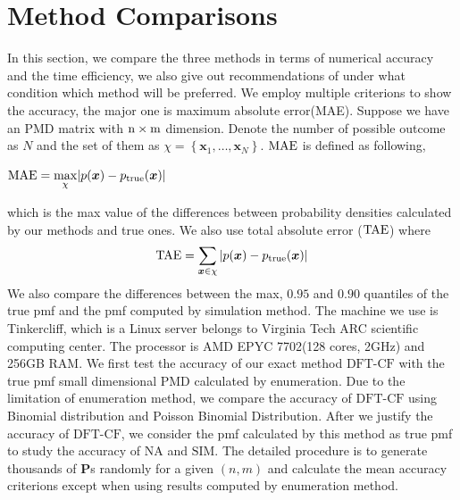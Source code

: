 \documentclass[12pt]{article}
\newcommand{\Pmat}{\mathbf{P}}
\newcommand{\TAE}{{\rm TAE}}
\newcommand{\MAE}{{\rm MAE}}
\newcommand{\PMD}{\textrm{PMD}}
\newcommand{\xvec}{\boldsymbol{x}}
\newcommand{\SIM}{{\textrm{SIM}}}
\newcommand{\NA}{{\textrm{NA}}}
\newcommand{\dft}{{\textrm{DFT-CF}}}
\begin{document}
\section{Method Comparisons}\label{sec:Method Comparisons}
In this section, we compare the three methods in terms of numerical accuracy and the time efficiency, we also give out recommendations of under what condition which method will be preferred. We employ multiple criterions to show the accuracy, the major one is maximum absolute error(MAE). Suppose we have an PMD matrix with $\rm n\times m$ dimension. Denote the number of possible outcome as $N$ and the set of them as $\chi = \left\{\xvec_1,\dots, \xvec_{N}\right\}$. $\MAE$ is defined as following,
\begin{center}
$\mathrm{\MAE} = \underset{\chi}{\max}|p(\xvec) - p_{\text{true}}(\xvec)|$
\end{center}
which is the max value of the differences between probability densities calculated by our methods and true ones.
We also use total absolute error ($\TAE$)  where
\begin{equation*}
    \mbox{\TAE} = \sum_{\xvec \in \chi} |p(\xvec) - p_{\text{true}}(\xvec)|
\end{equation*}
We also compare the differences between the max, $0.95$ and $0.90$ quantiles of the true pmf and the pmf computed by simulation method. The machine we use is Tinkercliff, which is a Linux server belongs to Virginia Tech ARC scientific computing center. The processor is AMD EPYC 7702(128 cores, 2GHz) and 256GB RAM. We first test the accuracy of our exact method $\dft$ with the true pmf small dimensional $\PMD$ calculated by enumeration. Due to the limitation of enumeration method, we compare the accuracy of $\dft$ using Binomial distribution and Poisson Binomial Distribution\cite{Hong2013}.
After we justify the accuracy of $\dft$, we consider the pmf calculated by this method as true pmf to study the accuracy of $\NA$ and $\SIM$. The detailed procedure is to generate thousands of $\Pmat$s randomly for a given $(n,m)$ and calculate the mean accuracy criterions except when using results computed by enumeration method.






\end{document}
